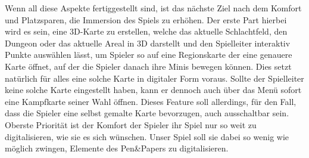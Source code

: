 Wenn all diese Aspekte fertiggestellt sind, ist das nächste Ziel nach dem Komfort und Platzsparen, die Immersion des
Spiels zu erhöhen.\n
Der erste Part hierbei wird es sein, eine 3D-Karte zu erstellen, welche das aktuelle Schlachtfeld, den Dungeon oder
das aktuelle Areal in 3D darstellt und den Spielleiter interaktiv Punkte auswählen lässt, um Spieler so auf eine
Regionskarte der eine genauere Karte öffnet, auf der die Spieler danach ihre Minis bewegen können.
Dies setzt natürlich für alles eine solche Karte in digitaler Form voraus.
Sollte der Spielleiter keine solche Karte eingestellt haben, kann er dennoch auch über das Menü sofort
eine Kampfkarte seiner Wahl öffnen.
Dieses Feature soll allerdings, für den Fall, dass die Spieler eine selbst gemalte Karte bevorzugen, auch
ausschaltbar sein.
Oberste Priorität ist der Komfort der Spieler ihr Spiel nur so weit zu digitalisieren, wie sie es sich wünschen.
Unser Spiel soll sie dabei so wenig wie möglich zwingen, Elemente des Pen\&Papers zu digitalisieren.\n